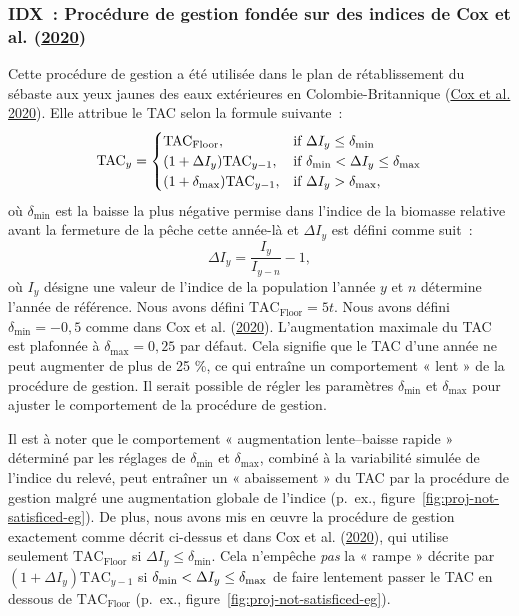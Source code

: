 \documentclass[french,11pt]{book}
\newcommand{\lt}{\ensuremath <}
\newcommand{\gt}{\ensuremath >}
\begin{document}
\hypertarget{sec:mp-idx}{%
\subsubsection{\texorpdfstring{IDX~: Procédure de gestion fondée sur des indices de Cox et al. (\protect\hyperlink{ref-cox2020}{2020})}{IDX~: Procédure de gestion fondée sur des indices de Cox et al. (2020)}}\label{sec:mp-idx}}

Cette procédure de gestion a été utilisée dans le plan de rétablissement du sébaste aux yeux jaunes des eaux extérieures en Colombie-Britannique (\protect\hyperlink{ref-cox2020}{Cox et al. 2020}). Elle attribue le TAC selon la formule suivante~:
\begin{equation}
\textrm{TAC}_y =
\begin{cases}
\textrm{TAC}_\textrm{Floor}, & \textrm{if}\ \Delta I_y \leq \delta_\textrm{min} \\
(1 + \Delta I_y ) \textrm{TAC}_{y-1}, & \textrm{if}\ \delta_\textrm{min} \lt \Delta I_y \leq \delta_\textrm{max} \\
(1 + \delta_\textrm{max}) \textrm{TAC}_{y-1}, & \textrm{if}\ \Delta I_y \gt \delta_\textrm{max},
\end{cases}
\end{equation}
où \(\delta_\textrm{min}\) est la baisse la plus négative permise dans l'indice de la biomasse relative avant la fermeture de la pêche cette année-là et \(\Delta I_y\) est défini comme suit~:
\begin{equation}
\Delta I_y = \frac{I_y}{I_{y-n}} - 1,
\end{equation}
où \(I_y\) désigne une valeur de l'indice de la population l'année \(y\) et \(n\) détermine l'année de référence. Nous avons défini \(\textrm{TAC}_\textrm{Floor} = 5 t\). Nous avons défini \(\delta_\textrm{min} = -0,5\) comme dans Cox et al. (\protect\hyperlink{ref-cox2020}{2020}). L'augmentation maximale du TAC est plafonnée à \(\delta_\textrm{max} = 0,25\) par défaut. Cela signifie que le TAC d'une année ne peut augmenter de plus de 25 \%, ce qui entraîne un comportement « lent » de la procédure de gestion. Il serait possible de régler les paramètres \(\delta_\textrm{min}\) et \(\delta_\textrm{max}\) pour ajuster le comportement de la procédure de gestion.

Il est à noter que le comportement « augmentation lente--baisse rapide » déterminé par les réglages de \(\delta_\textrm{min}\) et \(\delta_\textrm{max}\), combiné à la variabilité simulée de l'indice du relevé, peut entraîner un « abaissement » du TAC par la procédure de gestion malgré une augmentation globale de l'indice (p.~ex., figure~\ref{fig:proj-not-satisficed-eg}). De plus, nous avons mis en œuvre la procédure de gestion exactement comme décrit ci-dessus et dans Cox et al. (\protect\hyperlink{ref-cox2020}{2020}), qui utilise seulement \(\textrm{TAC}_\textrm{Floor}\) si \(\Delta I_y \leq \delta_\textrm{min}\). Cela n'empêche \emph{pas} la « rampe » décrite par \((1 + \Delta I_y ) \textrm{TAC}_{y-1}\) si \(\delta_\textrm{min} \lt \Delta I_y \leq \delta_\textrm{max}\) de faire lentement passer le TAC en dessous de \(\textrm{TAC}_\textrm{Floor}\) (p.~ex., figure~\ref{fig:proj-not-satisficed-eg}).
\end{document}
